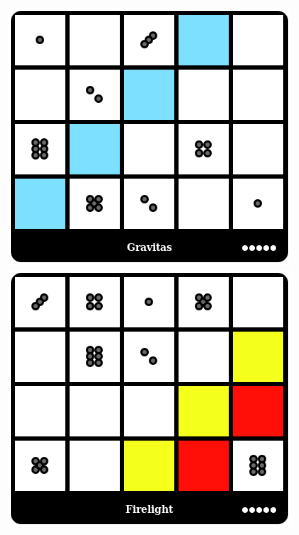 \centerline{\mbox{\includegraphics[width=75mm]{img/WPC/Gravitas.png}\includegraphics[width=75mm]{img/WPC/Firelight.png}}}
